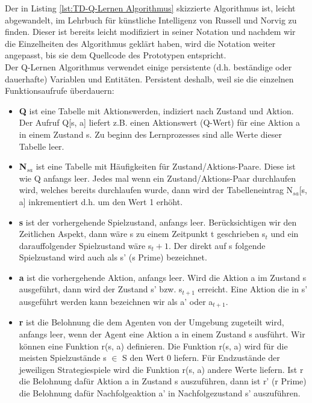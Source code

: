 Der in Listing \ref{lst:TD-Q-Lernen Algorithmus} skizzierte Algorithmus ist, leicht abgewandelt, im Lehrbuch für künstliche Intelligenz von Russell und Norvig \cite[974]{Russell} zu finden. Dieser ist bereits leicht modifiziert in seiner Notation und nachdem wir die Einzelheiten des Algorithmus geklärt haben, wird die Notation weiter angepasst, bis sie dem Quellcode des Prototypen entspricht. \\

Der Q-Lernen Algorithmus verwendet einige persistente (d.h. beständige oder dauerhafte) Variablen und Entitäten. Persistent deshalb, weil sie die einzelnen Funktionsaufrufe überdauern: 
\begin{itemize}

\item \textbf{Q} ist eine Tabelle mit Aktionswerden, indiziert nach Zustand und Aktion. Der Aufruf Q[s, a] liefert z.B. einen Aktionswert (Q-Wert) für eine Aktion a in einem Zustand s. Zu beginn des Lernprozesses sind alle Werte dieser Tabelle leer.

\item \textbf{N$_{sa}$} ist eine Tabelle mit Häufigkeiten für Zustand/Aktions-Paare.  Diese ist wie Q anfangs leer. Jedes mal wenn ein Zustand/Aktions-Paar durchlaufen wird, welches bereits durchlaufen wurde, dann wird der Tabelleneintrag N$_{sa}$[s, a] inkrementiert d.h. um den Wert 1 erhöht.

\item \textbf{s} ist der vorhergehende Spielzustand, anfangs leer. Berücksichtigen wir den Zeitlichen Aspekt, dann wäre s zu einem Zeitpunkt t geschrieben s${_t}$ und ein darauffolgender Spielzustand wäre s${_t+1}$. Der direkt auf s folgende Spielzustand wird auch als s' (s Prime) bezeichnet.

\item \textbf{a} ist die vorhergehende Aktion, anfangs leer. Wird die Aktion a im Zustand s ausgeführt, dann wird der Zustand s' bzw. s$_{t+1}$ erreicht. Eine Aktion die in s' ausgeführt werden kann bezeichnen wir als a' oder a$_{t+1}$.

\item \textbf{r} ist die Belohnung die dem Agenten von der Umgebung zugeteilt wird, anfangs leer, wenn der Agent eine Aktion a in einem Zustand s ausführt. Wir können eine Funktion r(s, a) definieren. Die Funktion r(s, a) wird für die meisten Spielzustände s $\in$ S den Wert 0 liefern. Für Endzustände der jeweiligen Strategiespiele wird die Funktion r(s, a) andere Werte liefern. Ist r die Belohnung dafür Aktion a in Zustand s auszuführen, dann ist r' (r Prime) die Belohnung dafür Nachfolgeaktion a' in Nachfolgezustand s' auszuführen.
\end{itemize}

